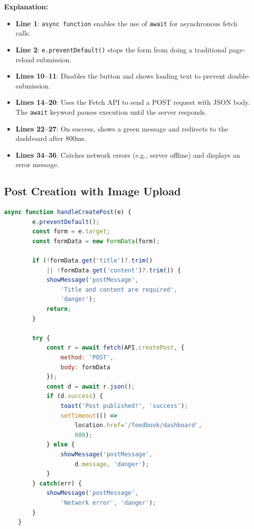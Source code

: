 \documentclass[12pt,a4paper]{report}
\begin{document}
\textbf{Explanation:}
\begin{itemize}
    \item \textbf{Line 1}: \texttt{async function} enables the use of \texttt{await} for asynchronous fetch calls.
    \item \textbf{Line 2}: \texttt{e.preventDefault()} stops the form from doing a traditional page-reload submission.
    \item \textbf{Lines 10--11}: Disables the button and shows loading text to prevent double-submission.
    \item \textbf{Lines 14--20}: Uses the Fetch API to send a POST request with JSON body. The \texttt{await} keyword pauses execution until the server responds.
    \item \textbf{Lines 22--27}: On success, shows a green message and redirects to the dashboard after 800ms.
    \item \textbf{Lines 34--36}: Catches network errors (e.g., server offline) and displays an error message.
\end{itemize}

\subsection{Post Creation with Image Upload}

\begin{lstlisting}[language=JavaScript]
    async function handleCreatePost(e) {
        e.preventDefault();
        const form = e.target;
        const formData = new FormData(form);

        if (!formData.get('title')?.trim()
            || !formData.get('content')?.trim()) {
            showMessage('postMessage',
                'Title and content are required',
                'danger');
            return;
        }

        try {
            const r = await fetch(API.createPost, {
                method: 'POST',
                body: formData
            });
            const d = await r.json();
            if (d.success) {
                toast('Post published!', 'success');
                setTimeout(() =>
                    location.href='/feedbook/dashboard',
                    800);
            } else {
                showMessage('postMessage',
                    d.message, 'danger');
            }
        } catch(err) {
            showMessage('postMessage',
                'Network error', 'danger');
        }
    }
\end{lstlisting}
\end{document}
